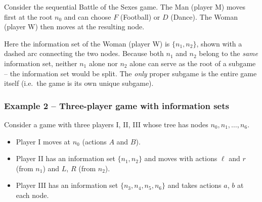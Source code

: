 \documentclass[12pt, a4paper]{article}
\begin{document}
Consider the sequential Battle of the Sexes game. The Man (player M)
moves first at the root $n_0$ and can choose $F$ (Football) or $D$ (Dance).
The Woman (player W) then moves at the resulting node.

\begin{center}
\end{center}

Here the information set of the Woman (player W) is $\{n_1, n_2\}$, shown
with a dashed arc connecting the two nodes. Because both $n_1$ and $n_2$
belong to the \emph{same} information set, neither $n_1$ alone nor $n_2$
alone can serve as the root of a subgame -- the information set would be
split. The \emph{only} proper subgame is the entire game itself (i.e.\ the
game is its own unique subgame).

\subsubsection*{Example 2 -- Three-player game with information sets}

Consider a game with three players I, II, III whose tree has nodes
$n_0, n_1, \ldots, n_6$.
\begin{itemize}
  \item Player I moves at $n_0$ (actions $A$ and $B$).
  \item Player II has an information set $\{n_1, n_2\}$ and moves with
        actions $\ell$ and $r$ (from $n_1$) and $L$, $R$ (from $n_2$).
  \item Player III has an information set $\{n_3, n_4, n_5, n_6\}$ and
        takes actions $a$, $b$ at each node.
\end{itemize}
\end{document}
